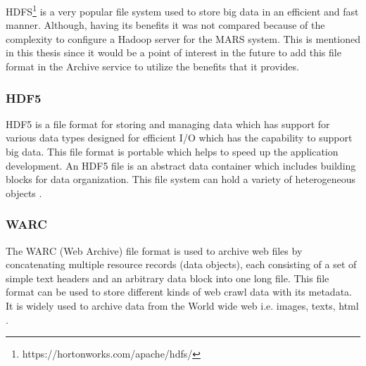 HDFS\footnote{https://hortonworks.com/apache/hdfs/} is a very popular file system used to store big data in an efficient and fast manner. 
Although, having its benefits it was not compared because of the complexity to configure a Hadoop server for the MARS system. This is mentioned in this thesis since it would be
a point of interest in the future to add this file format in the Archive service to utilize the benefits that it provides.

\subsubsection{HDF5}
HDF5 is a file format for storing and managing data which has support for various data types designed for
efficient I/O which has the capability to support big data. This file format is portable which helps to speed
up the application development. An HDF5 file is an abstract data container which includes building blocks for data organization. This file
system can hold a variety of heterogeneous objects \cite{Savic2007}. 

\subsubsection{WARC}
The WARC (Web Archive) file format is used to archive web files by concatenating multiple resource records
(data objects), each consisting of a set of simple text headers and an arbitrary data block into one long file.
This file format can be used to store different kinds of web crawl data with its metadata. It is widely used
 to archive data from the World wide web i.e. images, texts, html \cite{WARC}.

